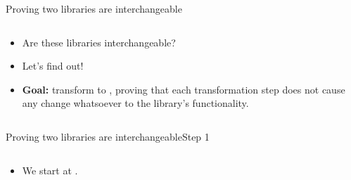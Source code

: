 \documentclass[aspectratio=169, lualatex, handout]{beamer}
\begin{document}
\begin{frame}{Proving two libraries are interchangeable}
	\begin{columns}[c]
		\begin{column}{0.5\textwidth}
			\begin{itemize}[<+->]
				\item Are these libraries interchangeable?
				\item Let's find out!
				\item \textbf{Goal:} transform  to , proving that each transformation step does not cause any change whatsoever to the library's functionality.
			\end{itemize}
		\end{column}
		\begin{column}{0.5\textwidth}
			\begin{flushright}
			\end{flushright}
		\end{column}
	\end{columns}
\end{frame}

\begin{frame}{Proving two libraries are interchangeable}{Step 1}
	\begin{columns}[c]
		\begin{column}{0.5\textwidth}
			\begin{itemize}
				\item We start at .
			\end{itemize}
		\end{column}
		\begin{column}{0.5\textwidth}
			\begin{center}
			\end{center}
		\end{column}
	\end{columns}
\end{frame}
\end{document}
